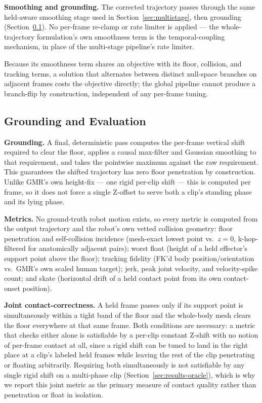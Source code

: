 \noindent\textbf{Smoothing and grounding.} The corrected trajectory passes
through the same held-aware smoothing stage used in
Section~\ref{sec:multistage}, then grounding (Section~\ref{sec:grounding}).
No per-frame re-clamp or rate limiter is applied --- the whole-trajectory
formulation's own smoothness term is the temporal-coupling mechanism, in
place of the multi-stage pipeline's rate limiter.

Because its smoothness term shares an objective with its floor, collision,
and tracking terms, a solution that alternates between distinct null-space
branches on adjacent frames costs the objective directly; the global
pipeline cannot produce a branch-flip by construction, independent of any
per-frame tuning.

\subsection{Grounding and Evaluation}
\label{sec:grounding}

\noindent\textbf{Grounding.} A final, deterministic pass computes the
per-frame vertical shift required to clear the floor, applies a causal
max-filter and Gaussian smoothing to that requirement, and takes the
pointwise maximum against the raw requirement. This guarantees the shifted
trajectory has zero floor penetration by construction. Unlike GMR's own
height-fix --- one rigid per-clip shift --- this is computed per frame, so
it does not force a single Z-offset to serve both a clip's standing phase
and its lying phase.

\noindent\textbf{Metrics.} No ground-truth robot motion exists, so every
metric is computed from the output trajectory and the robot's own vetted
collision geometry: floor penetration and self-collision incidence
(mesh-exact lowest point vs.\ $z=0$, k-hop-filtered for anatomically
adjacent pairs); worst float (height of a held effector's support point
above the floor); tracking fidelity (FK'd body position/orientation vs.\
GMR's own scaled human target); jerk, peak joint velocity, and
velocity-spike count; and skate (horizontal drift of a held contact point
from its own contact-onset position).

\noindent\textbf{Joint contact-correctness.} A held frame passes only if
its support point is simultaneously within a tight band of the floor and
the whole-body mesh clears the floor everywhere at that same frame. Both
conditions are necessary: a metric that checks either alone is satisfiable
by a per-clip constant Z-shift with no notion of per-frame contact at all,
since a rigid shift can be tuned to land in the right place at a clip's
labeled held frames while leaving the rest of the clip penetrating or
floating arbitrarily. Requiring both simultaneously is not satisfiable by
any single rigid shift on a multi-phase clip
(Section~\ref{sec:results-oracle}), which is why we report this joint
metric as the primary measure of contact quality rather than penetration or
float in isolation.

